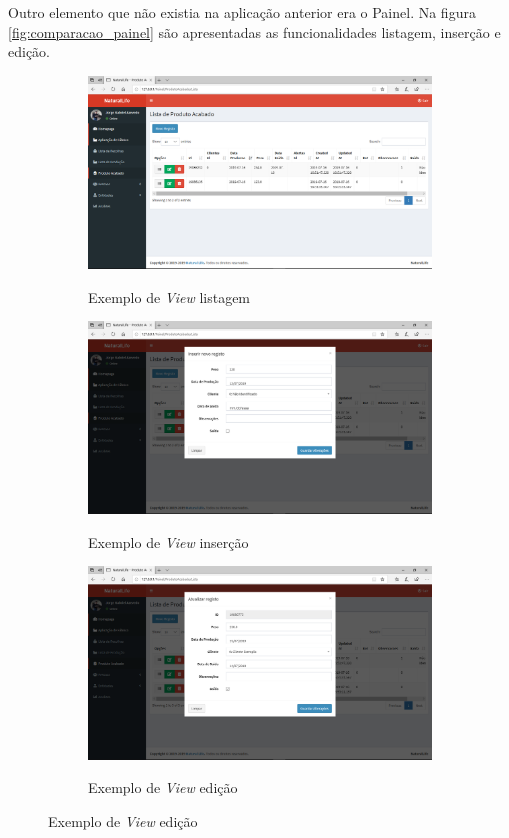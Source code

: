 \newpage
Outro elemento que não existia na aplicação anterior era o Painel. Na figura \ref{fig:comparacao_painel} são apresentadas as funcionalidades listagem, inserção e edição.
\begin{figure}[H]
	\centering
	
	\begin{subfigure}[t]{0.30\linewidth}
		\includegraphics[width=\linewidth]{figuras/AppPhp/8-lista.png}
		\label{fig:comparacao_painel_1}
		\caption{Exemplo de \textit{View} listagem}
	\end{subfigure}
	\begin{subfigure}[t]{0.30\linewidth}
		\includegraphics[width=\linewidth]{figuras/AppPhp/9-novo.png}
		\label{fig:comparacao_painel_1}
		\caption{Exemplo de \textit{View} inserção}
	\end{subfigure}
	\begin{subfigure}[t]{0.30\linewidth}
		\includegraphics[width=\linewidth]{figuras/AppPhp/10-editar.png}
		\label{fig:comparacao_painel_2}
		\caption{Exemplo de \textit{View} edição}
	\end{subfigure}
	

\end{figure}
